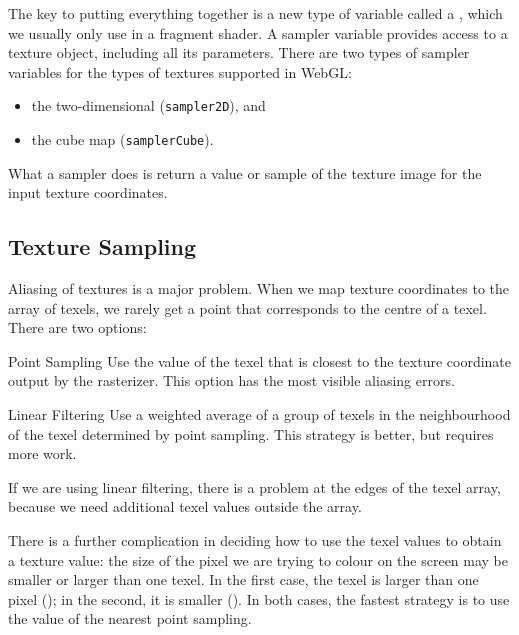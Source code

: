 \documentclass[../COS3712_Notes.tex]{subfiles}
\begin{document}
        The key to putting everything together is a new type of variable called a ,
        which we usually only use in a fragment shader.
        A sampler variable provides access to a texture object, including all its parameters.
        There are two types of sampler variables for the types of textures supported in WebGL:
        \begin{itemize}
          \item the two-dimensional (\texttt{sampler2D}), and
          \item the cube map (\texttt{samplerCube}).
        \end{itemize}
        What a sampler does is return a value or sample of the texture image
        for the input texture coordinates.

      \subsection{Texture Sampling}
        Aliasing of textures is a major problem.
        When we map texture coordinates to the array of texels, we rarely get a point
        that corresponds to the centre of a texel.
        There are two options:
        \begin{descriptimize}
          \item[Point Sampling] Use the value of the texel that is closest to the texture
            coordinate output by the rasterizer.
            This option has the most visible aliasing errors.
          \item[Linear Filtering] Use a weighted average of a group of texels in the neighbourhood
            of the texel determined by point sampling.
            This strategy is better, but requires more work.
        \end{descriptimize}
        If we are using linear filtering, there is a problem at the edges of the texel array,
        because we need additional texel values outside the array.

        There is a further complication in deciding how to use the texel values to obtain
        a texture value: the size of the pixel we are trying to colour on the screen
        may be smaller or larger than one texel.
        In the first case, the texel is larger than one pixel ();
        in the second, it is smaller ().
        In both cases, the fastest strategy is to use the value of the nearest point sampling.
\end{document}
